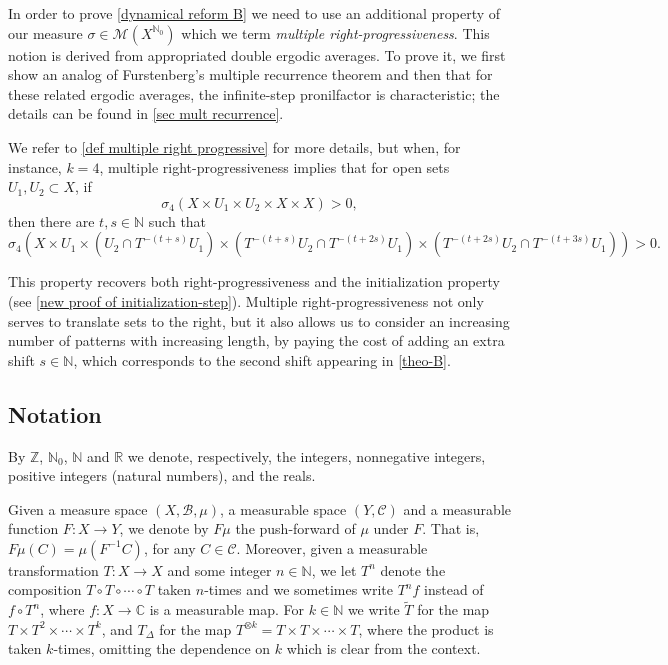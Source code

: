 \documentclass[letter, 11pt]{article}
\theoremstyle{definition}
\theoremstyle{plain}
\newcommand{\N}{\mathbb{N}}
\newcommand{\Z}{\mathbb{Z}}
\newcommand{\C}{\mathbb{C}}
\newcommand{\R}{\mathbb{R}}
\newcommand{\cM}{\mathcal{M}}
\newcommand{\1}{\mathbbm{1}}
\begin{document}
In order to prove \cref{dynamical reform B} we need to use an additional 
property of our measure $\sigma \in \cM(X^{\N_0})$ 
which we term \textit{multiple 
right-progressiveness}. This notion is derived from appropriated double ergodic averages. To prove it, we first show an analog of Furstenberg's multiple recurrence theorem and then that for these related ergodic averages, the infinite-step pronilfactor is characteristic; the details can be found in \cref{sec mult recurrence}.

We refer to \cref{def multiple right progressive} for more details, but when, for instance, $k=4$, multiple right-progressiveness implies that for open sets $U_1,U_2\subset X$, if
$$\sigma_4(X\times U_1\times U_2 \times X \times X)>0 ,$$
then there are $t,s\in \N$ such that
$$\sigma_4(X\times U_1\times (U_2\cap T^{-(t+s)}U_1)\times ( T^{-(t+s)}U_2\cap  T^{-(t+2s)}U_1)\times (  T^{-(t+2s)}U_2 \cap  T^{-(t+3s)}U_1) )>0.$$

This property recovers both right-progressiveness and the initialization property (see \cref{new proof of initialization-step}). Multiple right-progressiveness not only serves to translate sets to the right, but it also allows us to consider an increasing number of patterns with increasing length, by paying the cost of adding an extra shift $s\in \N$, which corresponds to the second shift appearing in \cref{theo-B}. 

\subsection{Notation}\label{notational conventions}
By $\Z$, $\N_0$, $\N$ and $\R$ we denote, respectively, the integers,
nonnegative integers, positive integers (natural numbers), and the reals. 

Given a measure space $(X, \mathcal{B},\mu)$, a measurable space 
$(Y,\mathcal{C})$ and a measurable function $F: X \to Y$, we denote by 
$F\mu$ the push-forward of $\mu$ under $F$. That is, $F\mu(C)=\mu(F^{-1}C)$, 
for any $C\in \mathcal{C}$. Moreover, given a measurable transformation $T:X \to X$ and some integer $n\in \N$, we let $T^n$ denote the composition $T \circ T \circ \cdots \circ T$ taken $n$-times and we sometimes write $T^nf$ instead of $f\circ T^n$, where $f: X\to \C$ is a measurable map. For $k\in \N$ we write $\tilde{T}$ for the map $T\times T^2 \times \cdots \times T^k$, and $T_{\Delta}$ for the map $T^{\otimes k}=T\times T \times \cdots \times T$, where the product is taken $k$-times, omitting the dependence on $k$ which is clear from the context.  
\end{document}
